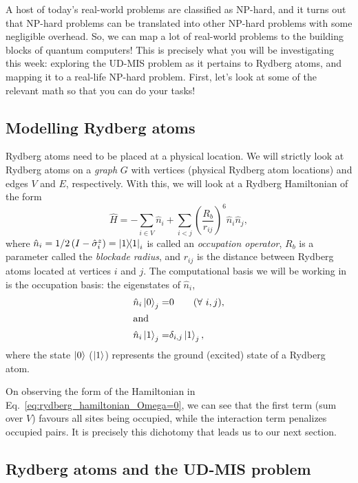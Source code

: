 \documentclass[12pt]{article}
\begin{document}
A host of today's real-world problems are classified as NP-hard, and it turns out that NP-hard problems can be translated into other NP-hard problems with some negligible overhead.
So, we can map a lot of real-world problems to the building blocks of quantum computers! 
This is precisely what you will be investigating this week: exploring the UD-MIS problem as it pertains to Rydberg atoms, and mapping it to a real-life NP-hard problem.
First, let's look at some of the relevant math so that you can do your tasks!

\subsection*{Modelling Rydberg atoms}

Rydberg atoms need to be placed at a physical location.
We will strictly look at Rydberg atoms on a {\it graph} $G$ with vertices (physical Rydberg atom locations) and edges $V$ and $E$, respectively.
With this, we will look at a Rydberg Hamiltonian of the form
\begin{equation} \label{eq:rydberg_hamiltonian_Omega=0}
	\hat{H} = -\sum_{i \in V} \hat{n}_i + \sum_{ i < j } \left( \frac{R_b}{r_{ij}} \right)^6 \hat{n}_i \hat{n}_j,
\end{equation}
where $\hat{n}_i = 1/2 \left( I - \hat{\sigma}_i^z \right) = \ketbra{1}{1}_i$ is called an {\it occupation operator}, $R_b$ is a parameter called the {\it blockade radius}, and $r_{ij}$ is the distance between Rydberg atoms located at vertices $i$ and $j$.
The computational basis we will be working in is the occupation basis: the eigenstates of $\hat{n}_i$,
\begin{subequations} \label{eq:occupation_basis}
    \begin{align} 
        \hat{n}_i \ket{0}_j =& 0 \qquad (\text{$\forall$ $i,j$}), \\
        \intertext{and}
        \hat{n}_i \ket{1}_j =& \delta_{i,j}\ket{1}_j,
    \end{align}
\end{subequations}
where the state $\ket{0}$ ($\ket{1}$) represents the ground (excited) state of a Rydberg atom.

On observing the form of the Hamiltonian in Eq.~\ref{eq:rydberg_hamiltonian_Omega=0}, we can see that the first term (sum over $V$) favours all sites being occupied, while the interaction term penalizes occupied pairs.
It is precisely this dichotomy that leads us to our next section.

\subsection*{Rydberg atoms and the UD-MIS problem}
\end{document}
